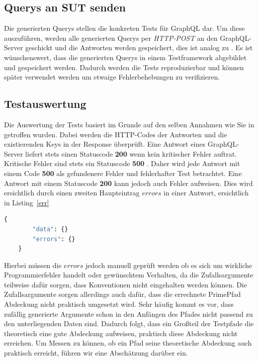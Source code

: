 \subsection{Querys an SUT senden}
\label{testf}

Die generierten Querys stellen die konkreten Tests für GraphQL dar.
Um diese auszuführen, werden alle generierten Querys per \textit{HTTP-POST} an den GraphQL-Server geschickt und die Antworten
werden gespeichert, dies ist analog zu \cite{property-based-testing}.
Es ist wünschenswert, dass die generierten Querys in einem Testframework abgebildet und gespeichert werden.
Dadurch werden die Tests reproduzierbar und können später verwendet werden um etwaige Fehlerbehebungen zu verifizieren.

\subsection{Testauswertung}

Die Auswertung der Tests basiert im Grunde auf den selben Annahmen wie Sie in \cite{property-based-testing} getroffen wurden.
Dabei werden die HTTP-Codes der Antworten und die existierenden Keys in der Response überprüft.
Eine Antwort eines GraphQL-Server liefert stets einen Statuscode \textbf{200} wenn kein kritischer Fehler auftrat.
Kritische Fehler sind stets ein Statuscode \textbf{500} \cite[vgl. 7. Response]{graphqlspecification}.
Daher wird jede Antwort mit einem Code \textbf{500} als gefundenere Fehler und fehlerhafter Test betrachtet.
Eine Antwort mit einem Statuscode \textbf{200} kann jedoch auch Fehler aufweisen.
Dies wird ersichtlich durch einen zweiten Haupteintrag $errors$ in einer Antwort, ersichtlich in Listing~\ref{err}

\begin{lstlisting}[language=GraphQL, label={err}, caption={fehlerhafte Antwort}]
    {
        "data": {}
        "errors": {}
    }
\end{lstlisting}

Hierbei müssen die $errors$ jedoch manuell geprüft werden ob es sich um wirkliche Programmierfehler handelt oder gewünschtem Verhalten,
da die Zufallsargumente teilweise dafür sorgen, dass Konventionen nicht eingehalten werden können.
Die Zufallsargumente sorgen allerdings auch dafür, dass die errechnete PrimePfad Abdeckung nicht praktisch umgesetzt wird.
Sehr häufig kommt es vor, dass zufällig generierte Argumente schon in den Anfängen des Pfades nicht passend zu den unterliegenden Daten sind.
Dadurch folgt, dass ein Großteil der Testpfade die theoretisch eine gute Abdeckung aufweisen, praktisch diese Abdeckung nicht erreichen.
Um Messen zu können, ob ein Pfad seine theoretische Abdeckung auch praktisch erreicht, führen wir eine Abschätzung darüber ein.

